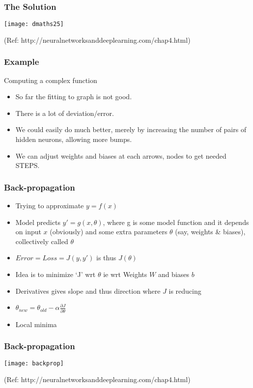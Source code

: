 \begin{frame}[fragile] \frametitle{The Solution}


\begin{center}
\texttt{[image: dmaths25]}
\end{center}

{\tiny (Ref: http://neuralnetworksanddeeplearning.com/chap4.html)}
\end{frame}


\begin{frame}[fragile] \frametitle{Example }
Computing a complex function
\begin{itemize}
\item So far the fitting to graph is not good. 
\item There is a lot of deviation/error.
\item We could easily do much better, merely by increasing the number of pairs of hidden neurons, allowing more bumps.
\item We can adjust weights and biases at each arrows, nodes to get needed STEPS.
\end{itemize}

\end{frame}


\begin{frame}[fragile] \frametitle{Back-propagation}
\begin{itemize}
\item Trying to approximate $y = f(x)$
\item Model predicts $y' = g(x, \theta)$, where g is some model function and it depends on input $x$ (obviously) and some extra parameters $\theta$ (say, weights \& biases), collectively called $\theta$
\item $Error = Loss = J(y,y')$ is thus $J (\theta)$
\item Idea is to minimize `J' wrt $\theta$ ie wrt Weights $W$ and biases $b$
\item Derivatives gives slope and thus direction where $J$ is reducing
\item $\theta_{new} = \theta_{old} - \alpha \frac{\partial J}{\partial \theta}$
\item Local minima
\end{itemize}
\end{frame}

\begin{frame}[fragile] \frametitle{Back-propagation}
\begin{center}
\texttt{[image: backprop]}
\end{center}
{\tiny (Ref: http://neuralnetworksanddeeplearning.com/chap4.html)}
\end{frame}


